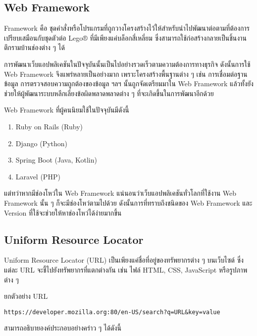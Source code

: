 \subsection{Web Framework}

Framework คือ ชุดคำสั่งหรือโปรแกรมที่ถูกวางโครงสร้างไว้ให้สำหรับนำไปพัฒนาต่อตามที่ต้องการ เปรียบเสมือนกับชุดตัวต่อ Lego® ที่มีเพียงแค่บล็อกสี่เหลี่ยม ซึ่งสามารถใช้ก่อสร้างกลายเป็นชิ้นงานตึกรามบ้านช่องต่าง ๆ ได้

การพัฒนาเว็บแอปพลิเคชันในปัจจุบันนั้นเป็นไปอย่างรวดเร็วตามความต้องการทางธุรกิจ ดังนั้นการใช้ Web Framework  จึงแพร่หลายเป็นอย่างมาก เพราะโครงสร้างพื้นฐานต่าง ๆ เช่น การเชื่อมต่อฐานข้อมูล การตรวจสอบความถูกต้องของข้อมูล ฯลฯ นั้นถูกจัดเตรียมมาใน Web Framework แล้วทั้งยังช่วยให้ผู้พัฒนาระบบหลีกเลี่ยงข้อผิดพลาดพลาดต่าง ๆ ที่จะเกิดขึ้นในการพัฒนาอีกด้วย

Web Framework ที่ผู้คนนิยมใช้ในปัจจุบันมีดังนี้

\begin{enumerate}
	\item Ruby on Rails (Ruby)
	\item Django (Python)
	\item Spring Boot (Java, Kotlin)
	\item Laravel (PHP)
\end{enumerate}

แต่ทว่าหากมีช่องโหว่ใน Web Framework แน่นอนว่าเว็บแอปพลิเคชันทั่วโลกที่ใช้งาน Web Framework นั้น ๆ ก็จะมีช่องโหว่ตามไปด้วย ดังนั้นการที่ทราบถึงชนิดของ Web Framework และ Version ที่ใช้จะช่วยให้หาช่องโหว่ได้ง่ายมากขึ้น

\subsection{Uniform Resource Locator}

Uniform Resource Locator (URL) เป็นเพียงแค่ชื่อที่อยู่ของทรัพยากรต่าง ๆ บนเว็บไซต์ ซึ่งแต่ละ URL จะชี้ไปยังทรัพยากรที่แตกต่างกัน เช่น ไฟล์ HTML, CSS, JavaScript หรือรูปภาพต่าง ๆ

ยกตัวอย่าง URL

\begin{lstlisting}
https://developer.mozilla.org:80/en-US/search?q=URL&key=value
\end{lstlisting}

สามารถอธิบายองค์ประกอบอย่างคร่าว ๆ ได้ดังนี้

